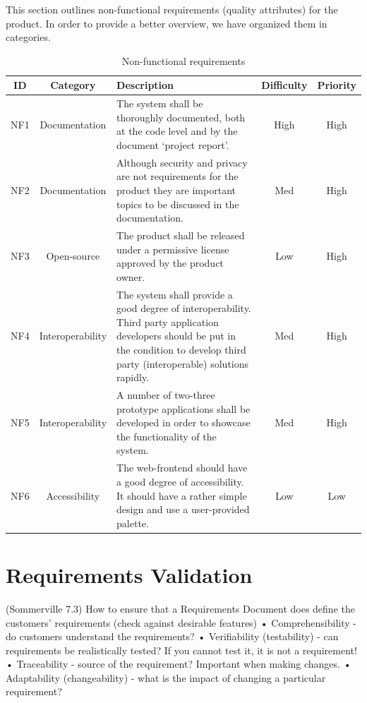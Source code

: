 This section outlines non-functional requirements (quality attributes) for the product.
In order to provide a better overview, we have organized them in categories.

\begin{table}[h]
\begin{center}
\begin{tabular}{ | c | c |p{6.5cm} | c | c |}
  \hline
  ID & Category & Description & Difficulty & Priority\\
  \hline\noalign{\smallskip}\noalign{\smallskip}\hline
  NF1 & Documentation & The system shall be thoroughly documented, both at the code level and by the document ‘project report’.
  & High & High \\
  NF2 & Documentation & Although security and privacy are not requirements for the product they are important topics to be discussed in the documentation.
  & Med & High \\
  NF3 & Open-source	& The product shall be released under a permissive license approved by the product owner.
  & Low & High \\
  NF4 & Interoperability & The system shall provide a good degree of interoperability. Third party application developers should be put in the condition to develop third party (interoperable) solutions rapidly.
  & Med & High \\
  NF5 & Interoperability & A number of two-three prototype applications shall be developed in order to showcase the functionality of the system.
  & Med & High \\
  NF6 & Accessibility & The web-frontend should have a good degree of accessibility. It should have a rather simple design and use a user-provided palette.
  & Low & Low \\
  \hline
\end{tabular}
\end{center}
\caption{Non-functional requirements}
\label{table:reqfrontend}
\end{table}


\section{Requirements Validation}
(Sommerville 7.3)
How to ensure that a Requirements Document does define 
the customers’ requirements (check against desirable 
features)
• Comprehensibility - do customers understand the 
requirements?
• Verifiability (testability) - can requirements be 
realistically tested? If you cannot test it, it is not a 
requirement!
• Traceability - source of the requirement? Important 
when making changes.
• Adaptability (changeability) - what is the impact of 
changing a particular requirement?

